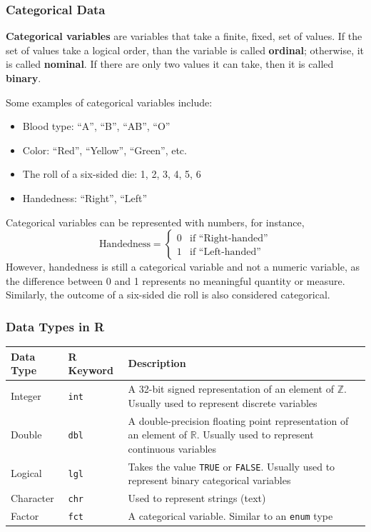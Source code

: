 \documentclass[10pt]{article}
\def\Z{{\mathbb Z}}
\def\R{{\mathbb R}}
\newenvironment{definition}[1][]{\begin{tcolorbox}[colframe=_orange,colback=_orange2,title=Definition. \ifthenelse{\isempty{#1}}{}{(#1)}
]}{\end{tcolorbox}}
\begin{document}
\subsubsection{Categorical Data}
\begin{definition}[Categorical Variables]
    \textbf{Categorical variables} are variables that take a finite, fixed, set of values. If the set of values take a logical order, than the variable is called \textbf{ordinal}; otherwise, it is called \textbf{nominal}. If there are only two values it can take, then it is called \textbf{binary}.
\end{definition}
Some examples of categorical variables include:
\begin{itemize}
    \item Blood type: ``A'', ``B'', ``AB'', ``O''
    \item Color: ``Red'', ``Yellow'', ``Green'', etc.
    \item The roll of a six-sided die: 1, 2, 3, 4, 5, 6
    \item Handedness: ``Right'', ``Left''
\end{itemize}
Categorical variables can be represented with numbers, for instance,
$$
    \text{Handedness}=\begin{cases}0&\text{if ``Right-handed''} \\ 1&\text{if ``Left-handed''}\end{cases}
$$
However, handedness is still a categorical variable and not a numeric variable, as the difference between 0 and 1 represents no meaningful quantity or measure. Similarly, the outcome of a six-sided die roll is also considered categorical.
\subsubsection{Data Types in R}
{
\small
\begin{tabular}{|l|l|p{4.5in}|}
\hline
\rowcolor[HTML]{EFEFEF} 
\textbf{Data Type} & \textbf{R Keyword} & \textbf{Description}                                                                                                   \\ \hline
Integer            & \texttt{int}       & A 32-bit signed representation of an element of $\Z$. Usually used to represent discrete variables                     \\ \hline
Double             & \texttt{dbl}       & A double-precision floating point representation of an element of $\R$. Usually used to represent continuous variables \\ \hline
Logical            & \texttt{lgl}       & Takes the value \texttt{TRUE} or \texttt{FALSE}. Usually used to represent binary categorical variables                 \\ \hline
Character          & \texttt{chr}       & Used to represent strings (text)                                                                                       \\ \hline
Factor             & \texttt{fct}        & A categorical variable. Similar to an \texttt{enum} type                                                               \\ \hline
\end{tabular}
}
\end{document}
